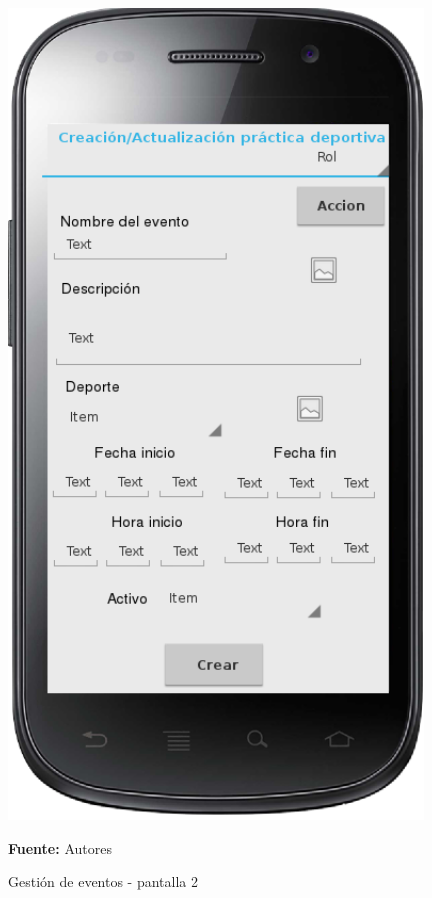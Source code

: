 \begin{figure}[!htb]
  \begin{center}
    \includegraphics[width=11cm]{./imagenes/UI/Eventos/gestion_eventos_2.png}
    \caption{Gestión de eventos - pantalla 2}
    \label{fig:gestion_eventos_2}
    \textbf{Fuente:}  Autores
  \end{center}
\end{figure}

